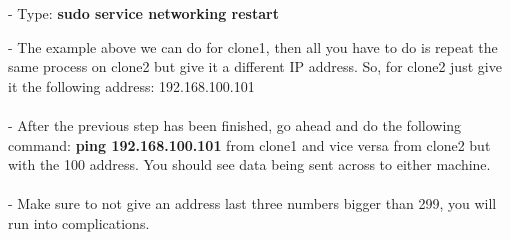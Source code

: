 \documentclass[11pt, a4papper]{article}
\begin{document}
\begin{adjustwidth}{3cm}{}
\noindent - Type: \textbf{sudo service networking restart} \\
\begin{adjustwidth}{1cm}{}
\indent - The example above we can do for clone1, then all you have to do is repeat the same process on clone2 but give it a different IP address. So, for clone2 just give it the following address: 192.168.100.101 \\ \\
 - After the previous step has been finished, go ahead and do the following command: \textbf{ping 192.168.100.101} from clone1 and vice versa from clone2 but with the 100 address. You should see data being sent across to either machine. \\ \\
 - Make sure to not give an address last three numbers bigger than 299, you will run into complications.
\end{adjustwidth}
\end{adjustwidth}
\end{document}
